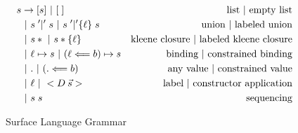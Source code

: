 \begin{figure}\footnotesize
\begin{center}
    \begin{align*}
       s &\to [s ]  \ |\  [\;]                   & \text{list} \ |\  \text{empty list}  \\
            &\ |\ s\; '|'\;s \ |\ s\; '|'\{\ell\}\;s              & \text{union} \ |\  \text{labeled union}   \\
            &\ |\ s* \ |\ s*\{\ell\}                                      & \text{kleene closure} \ |\  \text{labeled kleene closure}     \\
            &\ |\  \ell \mapsto s   \ |\  (\ell \Longleftarrow b) \mapsto s                   & \text{binding} \ |\  \text{constrained binding}    \\
            &\ |\  .    \ |\  (. \Longleftarrow b)                                                   & \text{any value} \ |\  \text{constrained value}   \\
            &\ |\  \ell  \ |\   <D\>\vec{s}>                                                & \text{label} \ |\  \text{constructor application}    \\
            &\ |\ s\;s                   & \text{sequencing}    \\
    \end{align*}
    \caption{Surface Language Grammar}
    \label{fig:the-surface-language}
\end{center}
\end{figure}
